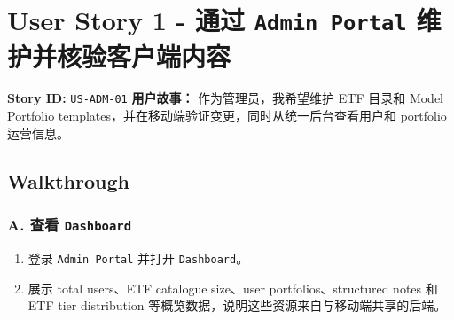 \section{User Story 1 - 通过 \texttt{Admin Portal} 维护并核验客户端内容}
\textbf{Story ID:} \texttt{US-ADM-01}
\textbf{用户故事：} 作为管理员，我希望维护 ETF 目录和 Model Portfolio templates，并在移动端验证变更，同时从统一后台查看用户和 portfolio 运营信息。
\subsection{Walkthrough}
\subsubsection{A. 查看 \texttt{Dashboard}}
\begin{enumerate}
\item 登录 \texttt{Admin Portal} 并打开 \texttt{Dashboard}。
\item 展示 total users、ETF catalogue size、user portfolios、structured notes 和 ETF tier distribution 等概览数据，说明这些资源来自与移动端共享的后端。
\end{enumerate}

